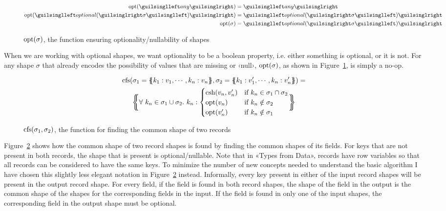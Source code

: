 \begin{figure}[ht!]
\begin{align*}
\opt(‹any›)                &= ‹any› \\
\opt(‹optional(›\sigma‹)›) &= ‹optional(›\sigma‹)› \\
\opt(\sigma)               &= ‹optional(›\sigma‹)›
\end{align*}
\caption{$\operatorname{opt}(\sigma)$, the function ensuring optionality/nullability of shapes}
\label{fig:opt}
\end{figure}

When we are working with optional shapes, we want optionality to be a boolean property, i.e. either something is optional, or it is not. For any shape $\sigma$ that already encodes the possibility of values that are missing or ‹null›, $\operatorname{opt}(\sigma)$, as shown in Figure~\ref{fig:opt}, is simply a no-op.

\begin{figure}[ht!]
\begin{gather*}
\cfs(\sigma_1 = \recd{ k_1 : v_1, \cdots, k_n : v_n }, \sigma_2 = \recd{ k_1 : v'_1, \cdots, k_n : v'_n }) = \\
\recd[\bigg]{
\forall\ k_n \in \sigma_1 \cup \sigma_2 .\ k_n : \begin{cases}
  \csh(v_n, v'_n) & \text{if } k_n \in \sigma_1 \cap \sigma_2 \\
  \opt(v_n) & \text{if } k_n \notin \sigma_2 \\
  \opt(v'_n) & \text{if } k_n \notin \sigma_1
\end{cases}
}
\end{gather*}
\caption{$\operatorname{cfs}(\sigma_1, \sigma_2)$, the function for finding the common shape of two records}
\label{fig:cfs}
\end{figure}

Figure~\ref{fig:cfs} shows how the common shape of two record shapes is found by finding the common shapes of its fields. For keys that are not present in both records, the shape that is present is optional/nullable. Note that in «Types from Data», records have row variables\cite{row-types} so that all records can be considered to have the same keys. To minimize the number of new concepts needed to understand the basic algorithm I have chosen this slightly less elegant notation in Figure~\ref{fig:cfs} instead. Informally, every key present in either of the input record shapes will be present in the output record shape. For every field, if the field is found in both record shapes, the shape of the field in the output is the common shape of the shapes for the corresponding fields in the input. If the field is found in only one of the input shapes, the corresponding field in the output shape must be optional.

